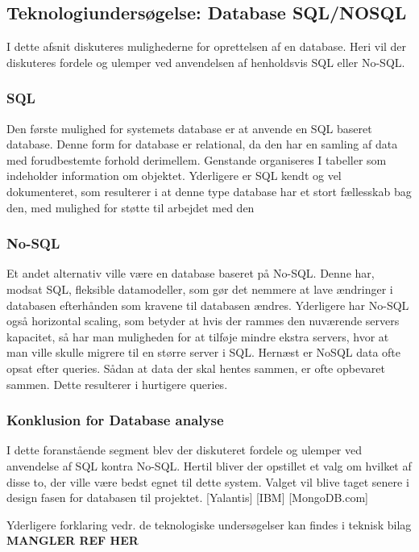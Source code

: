 \subsection{Teknologiundersøgelse: Database SQL/NOSQL
}
I dette afsnit diskuteres mulighederne for oprettelsen af en database. Heri vil der diskuteres fordele og ulemper ved anvendelsen af henholdsvis SQL eller No-SQL.

\subsubsection{SQL}
Den første mulighed for systemets database er at anvende en SQL baseret database. Denne form for database
er relational, da den har en samling af data med forudbestemte forhold derimellem. Genstande
organiseres I tabeller som indeholder information om objektet. Yderligere er SQL kendt og vel
dokumenteret, som resulterer i at denne type database har et stort fællesskab bag den, med mulighed
for støtte til arbejdet med den

\subsubsection{No-SQL}
Et andet alternativ ville være en database baseret på No-SQL. Denne har, modsat SQL, fleksible
datamodeller, som gør det nemmere at lave ændringer i databasen efterhånden som kravene til
databasen ændres. Yderligere har No-SQL også horizontal scaling, som betyder at hvis der rammes
den nuværende servers kapacitet, så har man muligheden for at tilføje mindre ekstra servers, hvor
at man ville skulle migrere til en større server i SQL. Hernæst er NoSQL data ofte opsat efter queries. Sådan at data der skal hentes sammen,
er ofte opbevaret sammen. Dette resulterer i hurtigere queries.

\subsubsection{Konklusion for Database analyse}
I dette foranstående segment blev der diskuteret fordele og ulemper ved anvendelse af SQL kontra
No-SQL. Hertil bliver der opstillet et valg om hvilket af disse to, der ville være bedst egnet til dette
system. Valget vil blive taget senere i design fasen for databasen til projektet.
[Yalantis] [IBM] [MongoDB.com]

Yderligere forklaring vedr. de teknologiske undersøgelser kan findes i teknisk bilag \textbf{MANGLER REF HER}
